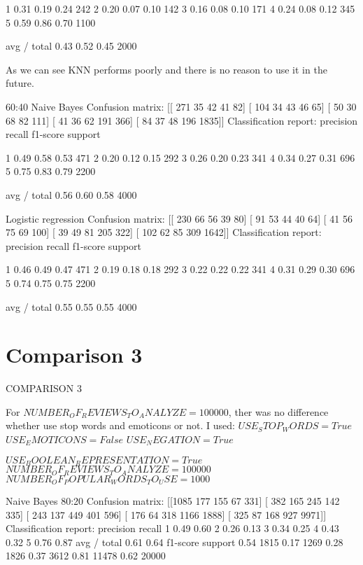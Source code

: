 \documentclass[12pt]{report}
\begin{document}
1       0.31      0.19      0.24       242
2       0.20      0.07      0.10       142
3       0.16      0.08      0.10       171
4       0.24      0.08      0.12       345
5       0.59      0.86      0.70      1100

avg / total       0.43      0.52      0.45      2000

As we can see KNN performs poorly and there is no reason to use it in the future.

60:40
Naive Bayes
Confusion matrix:
[[ 271   35   42   41   82]
[ 104   34   43   46   65]
[  50   30   68   82  111]
[  41   36   62  191  366]
[  84   37   48  196 1835]]
Classification report:
precision    recall  f1-score   support

1       0.49      0.58      0.53       471
2       0.20      0.12      0.15       292
3       0.26      0.20      0.23       341
4       0.34      0.27      0.31       696
5       0.75      0.83      0.79      2200

avg / total       0.56      0.60      0.58      4000

Logistic regression
Confusion matrix:
[[ 230   66   56   39   80]
[  91   53   44   40   64]
[  41   56   75   69  100]
[  39   49   81  205  322]
[ 102   62   85  309 1642]]
Classification report:
precision    recall  f1-score   support

1       0.46      0.49      0.47       471
2       0.19      0.18      0.18       292
3       0.22      0.22      0.22       341
4       0.31      0.29      0.30       696
5       0.74      0.75      0.75      2200

avg / total       0.55      0.55      0.55      4000

\newpage

\section{Comparison 3}

COMPARISON 3

For $NUMBER_OF_REVIEWS_TO_ANALYZE = 100000$, ther was no difference whether use stop words and emoticons or not. I used:
$USE_STOP_WORDS = True$
$USE_EMOTICONS = False$
$USE_NEGATION = True$

$USE_BOOLEAN_REPRESENTATION = True$
$NUMBER_OF_REVIEWS_TO_ANALYZE = 100000$
$NUMBER_OF_POPULAR_WORDS_TO_USE = 1000$



Naive Bayes 80:20
Confusion matrix:
[[1085  177  155   67  331]
[ 382  165  245  142  335]
[ 243  137  449  401  596]
[ 176   64  318 1166 1888]
[ 325   87  168  927 9971]]
Classification report:
precision    recall
1 0.49 0.60
2 0.26 0.13
3 0.34 0.25
4 0.43 0.32
5 0.76 0.87
avg / total       0.61      0.64
f1-score   support
0.54      1815
0.17      1269
0.28      1826
0.37      3612
0.81     11478
0.62 20000
\end{document}
